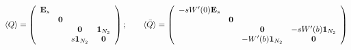 \begin{equation}\label{Qmatrixvevs}
\langle Q \rangle  = \left( \begin{array}{cccc}
 \mathrm{\bf E}_s & & & \\
 & {\bf 0} & &  \\
 & & {\bf 0}& {\bf 1}_{N_2}   \\
 & & s {\bf 1}_{N_2}& {\bf 0}
\end{array} \right) ; \qquad
\langle \bar Q \rangle = \left( \begin{array}{cccc}
 -s W'(0)\mathrm{\bf E}_s & & & \\
 & {\bf 0} & &  \\
 & & {\bf 0}& -s W'(b){\bf 1}_{N_2}   \\
 & & -W'(b) {\bf 1}_{N_2}& {\bf 0}
\end{array} \right)
\end{equation}

